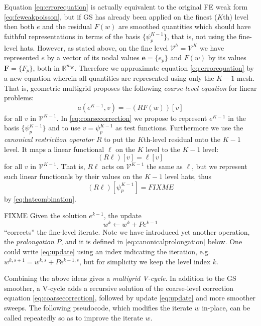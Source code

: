 \documentclass[letterpaper,final,12pt,reqno]{amsart}
\theoremstyle{claim}
\newcommand{\RR}{\mathbb{R}}
\newcommand{\be}{\mathbf{e}}
\newcommand{\bF}{\mathbf{F}}
\numberwithin{equation}{section}
\numberwithin{figure}{section}
\numberwithin{table}{section}
\begin{document}
Equation \eqref{eq:errorequation} is actually equivalent to the original FE weak form \eqref{eq:feweakpoisson}, but if GS has already been applied on the finest ($K$th) level then both $e$ and the residual $F(w)$ are smoothed quantities which should have faithful representations in terms of the basis $\{\psi_p^{K-1}\}$, that is, not using the fine-level hats.  However, as stated above, on the fine level $\mathcal{V}^h=\mathcal{V}^K$ we have represented $e$ by a vector of its nodal values $\be = \{e_p\}$ and $F(w)$ by its values $\bF=\{F_p\}$, both in $\RR^{m_K}$.  Therefore we approximate equation \eqref{eq:errorequation} by a new equation wherein all quantities are represented using only the $K-1$ mesh.  That is, geometric multigrid proposes the following \emph{coarse-level equation} for linear problems:
\begin{equation}
  a(e^{K-1},v) = - (RF(w))[v]  \label{eq:coarsecorrection}
\end{equation}
for all $v$ in $\mathcal{V}^{K-1}$.  In \eqref{eq:coarsecorrection} we propose to represent $e^{K-1}$ in the basis $\{\psi_p^{K-1}\}$ and to use $v=\psi_p^{K-1}$ as test functions.  Furthermore we use the \emph{canonical restriction operator} $R$ to put the $K$th-level residual onto the $K-1$ level.  It maps a linear functional $\ell$ on the $K$ level to the $K-1$ level:
\begin{equation}
  (R \ell)[v] = \ell[v] \label{eq:canonicalrestriction}
\end{equation}
for all $v$ in $\mathcal{V}^{K-1}$.  That is, $R \ell$ acts on $\mathcal{V}^{K-1}$ the same as $\ell$, but we represent such linear functionals by their values on the $K-1$ level hats, thus
\begin{equation}
  (R \ell)[\psi_p^{K-1}] = FIXME
\end{equation}
by \eqref{eq:hatcombination}.

FIXME  Given the solution $e^{k-1}$, the update
\begin{equation}
  w^k \gets w^k + P e^{k-1}  \label{eq:update}
\end{equation}
``corrects'' the fine-level iterate.  Note we have introduced yet another operation, the \emph{prolongation} $P$, and it is defined in \eqref{eq:canonicalprolongation} below.  One could write \eqref{eq:update} using an index indicating the iteration, e.g.~$w^{k,s+1} = w^{k,s} + Pe^{k-1,s}$, but for simplicity we keep the level index $k$.

Combining the above ideas gives a \emph{multigrid V-cycle}.  In addition to the GS smoother, a V-cycle adds a recursive solution of the coarse-level correction equation \eqref{eq:coarsecorrection}, followed by update \eqref{eq:update} and more smoother sweeps.  The following pseudocode, which modifies the iterate $w$ in-place, can be called repeatedly so as to improve the iterate $w$.
\end{document}
